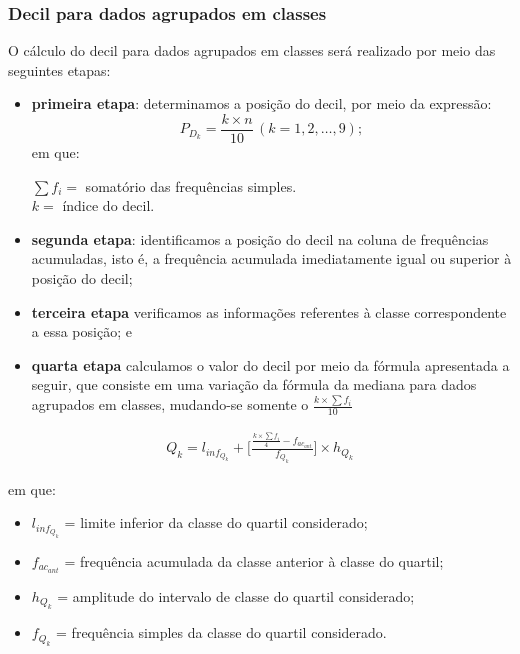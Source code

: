 \subsubsection{Decil para dados agrupados em classes}

O cálculo do decil para dados agrupados em classes será realizado por meio das seguintes etapas:

\begin{itemize}
    \item \textbf{primeira etapa}: determinamos a posição do decil, por meio da expressão:
   \[
        P_{D_k}=\frac{k\times n}{10}\,(k=1,2,\dots, 9);
    \]
    em que:

    \(\sum f_i =\) somatório das frequências simples.\\
    \(k=\) índice do decil.
\medskip
    \item \textbf{segunda etapa}: identificamos a posição do decil na coluna de frequências acumuladas, isto é, a frequência acumulada imediatamente igual ou superior à posição do decil;
    \item \textbf{terceira etapa} verificamos as informações referentes à classe correspondente a essa posição; e
    \item \textbf{quarta etapa} calculamos o valor do decil por meio da fórmula apresentada a seguir, que consiste em uma variação da fórmula da mediana para dados agrupados em classes, mudando-se somente o \(\frac{k\times \sum f_i}{10}\)

\end{itemize}

\begin{align*}
    Q_k=l_{inf_{Q_k}}+\Bigg[\frac{\frac{k\times \sum f_i}{4}-f_{ac_{ant}}}{f_{Q_k}}\Bigg]\times h_{Q_k}
\end{align*}

em que:
\begin{itemize}
    \item \(l_{inf_{Q_k}}\) = limite inferior da classe do quartil considerado;
    \item \(f_{ac_{ant}}\) = frequência acumulada da classe anterior à classe do quartil;
    \item \(h_{Q_k}\) = amplitude do intervalo de classe do quartil considerado;
    \item \(f_{Q_k}\) = frequência simples da classe do quartil considerado.
\end{itemize}

